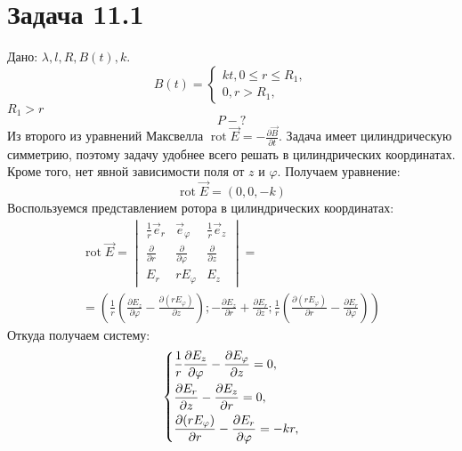 \documentclass[11pt]{article}
\begin{document}
\section{Задача 11.1}
\label{sec:org9613046}
Дано: \(\lambda, l, R, B(t), k\).
\begin{equation*}
B(t) = \begin{cases}
kt, 0 \leq r \leq R_1,\\
0, r > R_1,
\end{cases}
\end{equation*}
\(R_1 > r\)
$$P - ?$$
Из второго из уравнений Максвелла \(\operatorname{rot}\vec E = -\frac{\partial\vec B}{\partial t}\). Задача имеет
цилиндрическую симметрию, поэтому задачу удобнее всего решать в цилиндрических координатах. Кроме того, нет явной
зависимости поля от \(z\) и \(\varphi\). Получаем уравнение:
\begin{equation}
\operatorname{rot}\vec E = (0, 0, -k)
\end{equation}
Воспользуемся представлением ротора в цилиндрических координатах:
\begin{multline*}
\operatorname{rot}\vec E = 
\begin{vmatrix}
\frac{1}r \vec e_r          & \vec e_\varphi                    & \frac{1}r \vec e_z       \\
\frac{\partial}{\partial r} & \frac{\partial}{\partial \varphi} & \frac{\partial}{\partial z} \\
E_r                         & r E_\varphi                       & E_z
\end{vmatrix}
= \\
= \left(\frac{1}{r}\left(\frac{\partial E_z}{\partial\varphi} - \frac{\partial (rE_\varphi)}{\partial z}\right);
-\frac{\partial E_z}{\partial r} + \frac{\partial E_r}{\partial z};
\frac{1}r\left(\frac{\partial (rE_\varphi)}{\partial r} - \frac{\partial E_r}{\partial\varphi}\right)\right)
\end{multline*}
Откуда получаем систему:
\begin{equation*}
\begin{dcases}
\frac{1}r\frac{\partial E_z}{\partial \varphi} - \frac{\partial E_\varphi}{\partial z} = 0, \\
\frac{\partial E_r}{\partial z} - \frac{\partial E_z}{\partial r} = 0, \\
\frac{\partial (rE_\varphi)}{\partial r} - \frac{\partial E_r}{\partial\varphi} = -kr, \\
\end{dcases}
\end{equation*}
\end{document}
